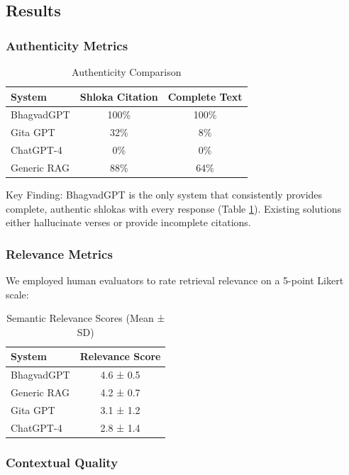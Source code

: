 \documentclass[conference]{IEEEtran}
\begin{document}
\subsection{Results}

\subsubsection{Authenticity Metrics}

\begin{table}[htbp]
\caption{Authenticity Comparison}
\centering
\begin{tabular}{|l|c|c|}
\hline
\textbf{System} & \textbf{Shloka Citation} & \textbf{Complete Text} \\
\hline
BhagvadGPT & 100\% & 100\% \\
Gita GPT & 32\% & 8\% \\
ChatGPT-4 & 0\% & 0\% \\
Generic RAG & 88\% & 64\% \\
\hline
\end{tabular}
\label{tab:authenticity}
\end{table}

Key Finding: BhagvadGPT is the only system that consistently provides complete, authentic shlokas with every response (Table \ref{tab:authenticity}). Existing solutions either hallucinate verses or provide incomplete citations.


\subsubsection{Relevance Metrics}

We employed human evaluators to rate retrieval relevance on a 5-point Likert scale:

\begin{table}[htbp]
\caption{Semantic Relevance Scores (Mean ± SD)}
\centering
\begin{tabular}{|l|c|}
\hline
\textbf{System} & \textbf{Relevance Score} \\
\hline
BhagvadGPT & 4.6 ± 0.5 \\
Generic RAG & 4.2 ± 0.7 \\
Gita GPT & 3.1 ± 1.2 \\
ChatGPT-4 & 2.8 ± 1.4 \\
\hline
\end{tabular}
\label{tab:relevance}
\end{table}

\subsubsection{Contextual Quality}
\end{document}

